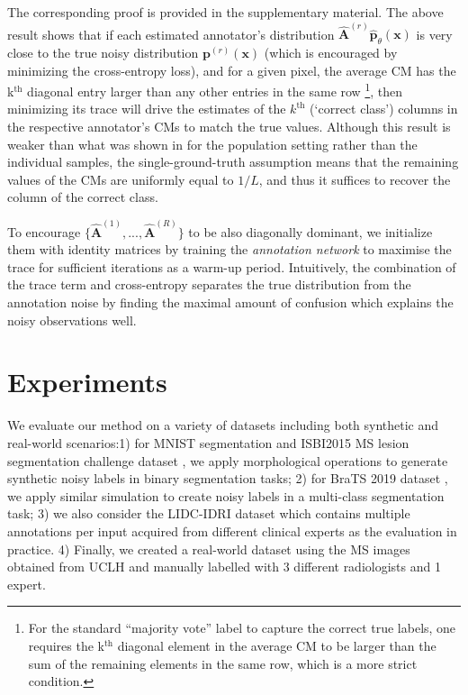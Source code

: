 The corresponding proof is provided in the supplementary material. The above result shows that if each estimated annotator's distribution $\hat{\textbf{A}}^{(r)}\hat{\textbf{p}}_{\theta}(\mathbf{x})$ is very close to the true noisy distribution $\textbf{p}^{(r)}(\mathbf{x})$ (which is encouraged by minimizing the cross-entropy loss), and for a given pixel, the average CM has the k$^{\text{th}}$ diagonal entry larger than any other entries in the same row \footnote{For the standard ``majority vote'' label to capture the correct true labels, one requires the k$^{\text{th}}$ diagonal element in the average CM to be larger than the sum of the remaining elements in the same row, which is a more strict condition.}, then minimizing its trace will drive the estimates of the $k^{\text{th}}$ (`correct class') columns in the respective annotator's CMs to match the true values. Although this result is weaker than what was shown in \cite{tanno2019learning} for the population setting rather than the individual samples, the single-ground-truth assumption means that the remaining values of the CMs are uniformly equal to $1/L$, and thus it suffices to recover the column of the correct class.  

To encourage $\{\hat{\mathbf{A}}^{(1)}, ..., \hat{\mathbf{A}}^{(R)}\}$ to be also diagonally dominant, we initialize them with identity matrices by training the \textit{annotation network} to maximise the trace for sufficient iterations as a warm-up period. Intuitively, the combination of the trace term and cross-entropy separates the true distribution from the annotation noise by finding the maximal amount of confusion which explains the noisy observations well. 

\section{Experiments}
We evaluate our method on a variety of datasets including both synthetic and real-world scenarios:1) for MNIST segmentation and ISBI2015 MS lesion segmentation challenge dataset \cite{jesson2015hierarchical}, we apply morphological operations to generate synthetic noisy labels in binary segmentation tasks; 2) for BraTS 2019 dataset \cite{menze2014multimodal}, we apply similar simulation to create noisy labels in a multi-class segmentation task; 3) we also consider the LIDC-IDRI dataset which contains multiple annotations per input acquired from different clinical experts as the evaluation in practice. 4) Finally, we created a real-world dataset using the MS images obtained from UCLH and manually labelled with 3 different radiologists and 1 expert.

